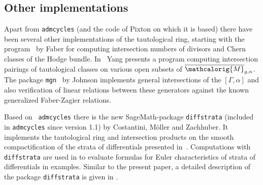 \documentclass[11pt]{article}
\newcommand{\M}{\ensuremath{\overline{\mathcalorig{M}}}}
\newcommand{\Sage}{SageMath}
\newcommand{\admcycles}{\texttt{admcycles}}
\begin{document}
\subsection*{Other implementations}
Apart from \admcycles{} (and the code of Pixton on which it is based) there have been several other implementations of the tautological ring,  starting with the program~\cite{faberdivisors} by Faber for computing intersection numbers of divisors and Chern classes of the Hodge bundle. In~\cite{Yang2008} Yang presents a program computing intersection pairings of tautological classes on various open subsets of $\M_{g,n}$. The package \texttt{mgn}~\cite{djohnson} by Johnson implements general intersections of the $[\Gamma, \alpha]$ and also verification of linear relations between these generators against the known generalized Faber-Zagier relations.

Based on ~\admcycles{} there is the new \Sage{}-package \texttt{diffstrata} (included in \admcycles{} since version 1.1) by Costantini,  M\"oller and Zachhuber. It implements the tautological ring and intersection products on the smooth compactification of the strata of differentials presented in~\cite{BCGGM3}. Computations with \texttt{diffstrata} are used in \cite{strataeulerchar} to evaluate formulas for Euler characteristics of strata of differentials in examples. Similar to the present paper, a detailed description of the package \texttt{diffstrata} is given in  \cite{diffstratamanual}.







\end{document}
